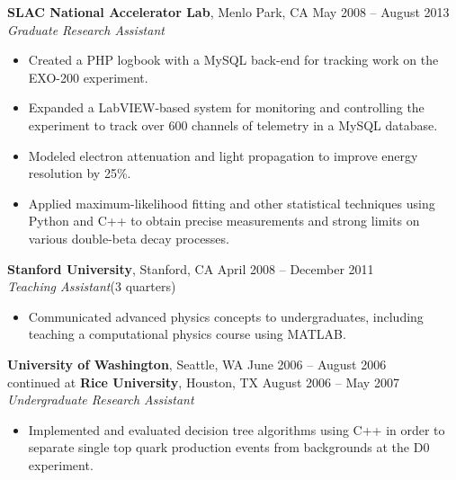 \documentclass[margin,line]{resume}
\begin{document}
\begin{resume}
    \textbf{SLAC National Accelerator Lab}, Menlo Park, CA \hfill May 2008 -- August 2013\vspace{1mm}\\\vspace{1mm}%
    \textsl{Graduate Research Assistant}
    \begin{itemize}
    \item Created a PHP logbook with a MySQL back-end for tracking work on the EXO-200 experiment.
    \item Expanded a LabVIEW-based system for monitoring and controlling the experiment to track over 600 channels of telemetry in a MySQL database.
    \item Modeled electron attenuation and light propagation to improve energy resolution by 25\%.
    \item Applied maximum-likelihood fitting and other statistical techniques using Python and C++ to obtain precise measurements and strong limits on various double-beta decay processes.
    \end{itemize}
    
    \textbf{Stanford University}, Stanford, CA \hfill April 2008 -- December 2011 \vspace{0mm}\\
    \textsl{Teaching Assistant}\hfill (3 quarters)%
    \begin{itemize}
    \item Communicated advanced physics concepts to undergraduates, including teaching a computational physics course using MATLAB.
    \end{itemize}
    
    \textbf{University of Washington}, Seattle, WA \hfill June 2006 -- August 2006 \vspace{0mm}\\
    continued at \textbf{Rice University}, Houston, TX \hfill August 2006 -- May 2007 \vspace{1mm}\\\vspace{1mm}%
    \textsl{Undergraduate Research Assistant}
    \begin{itemize}
    \item Implemented and evaluated decision tree algorithms using C++ in order to separate single top quark production events from backgrounds at the D0 experiment.
    \end{itemize}
 

\end{resume}
\end{document}
